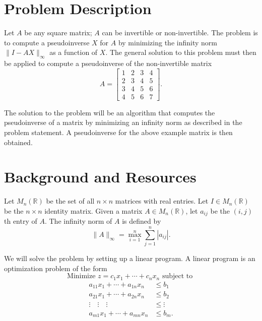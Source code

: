 \documentclass[12pt, a4paper, notitlepage]{report}
\newcommand{\RR}{\mathbb{R}}
\begin{document}
\section{Problem Description}

Let $A$ be any square matrix; $A$ can be invertible or non-invertible. The problem is to compute a pseudoinverse $X$ for $A$ by minimizing the infinity norm $\|I-AX\|_\infty$ as a function of $X$. The general solution to this problem must then be applied to compute a pseudoinverse of the non-invertible matrix
\[ A =
\begin{bmatrix}
1 & 2 & 3 & 4 \\
2 & 3 & 4 & 5 \\
3 & 4 & 5 & 6 \\
4 & 5 & 6 & 7
\end{bmatrix}. \]

The solution to the problem will be an algorithm that computes the pseudoinverse of a matrix by minimizing an infinity norm as described in the problem statement. A pseudoinverse for the above example matrix is then obtained.

\section{Background and Resources}

Let $M_n(\RR)$ be the set of all $n\times n$ matrices with real entries. Let $I\in M_n(\RR)$ be the $n\times n$ identity matrix. Given a matrix $A\in M_n(\RR)$, let $a_{ij}$ be the $(i,j)$th entry of $A$. The infinity norm of $A$ is defined by
\[ \|A\|_\infty = \max_{i=1}^n \sum_{j=1}^n |a_{ij}|. \]

We will solve the problem by setting up a linear program. A linear program is an optimization problem of the form
\[ \mbox{Minimize } z = c_1x_1+\cdots+c_nx_n \mbox{ subject to } \]
\begin{align*}
a_{11}x_1 + \cdots + a_{1n}x_n &\leq b_1 \\
a_{21}x_1 + \cdots + a_{2n}x_n &\leq b_2 \\
\vdots \quad \vdots \quad \vdots &\leq \vdots \\
a_{m1}x_1 + \cdots + a_{mn}x_n &\leq b_m.
\end{align*}
\end{document}
